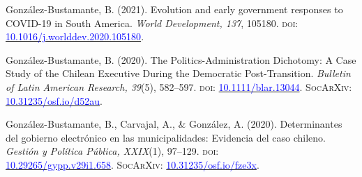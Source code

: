 \begin{publications}
\begin{benumerate}{9}
\item{\small González-Bustamante, B. (2021). Evolution and early government responses to COVID-19 in South America. {\itshape World Development, 137}, 105180. {\scshape doi:} \href{https://doi.org/10.1016/j.worlddev.2020.105180}{\textcolor{blue}{10.1016/j.worlddev.2020.105180}}.}\vspace{1mm}

\item{\small González-Bustamante, B. (2020). The Politics-Administration Dichotomy: A Case Study of the Chilean Executive During the Democratic Post-Transition. {\itshape Bulletin of Latin American Research, 39}(5), 582--597. {\scshape doi}: \href{https://doi.org/10.1111/blar.13044}{\textcolor{blue}{10.1111/blar.13044}}. {\scshape \footnotesize SocArXiv:} \href{https://doi.org/10.31235/osf.io/d52au}{\textcolor{blue}{10.31235/osf.io/d52au}}.}\vspace{1mm}


\item{\small González-Bustamante, B., Carvajal, A., \& González, A. (2020). Determinantes del gobierno electrónico en las municipalidades: Evidencia del caso chileno. {\itshape Gestión y Política Pública, XXIX}(1), 97--129. {\scshape doi:} \\ \href{http://dx.doi.org/10.29265/gypp.v29i1.658}{\textcolor{blue}{10.29265/gypp.v29i1.658}}. {\scshape \footnotesize SocArXiv:} \href{https://doi.org/10.31235/osf.io/fze3x}{\textcolor{blue}{10.31235/osf.io/fze3x}}.} \vspace{1mm}



\end{benumerate}
\end{publications}
